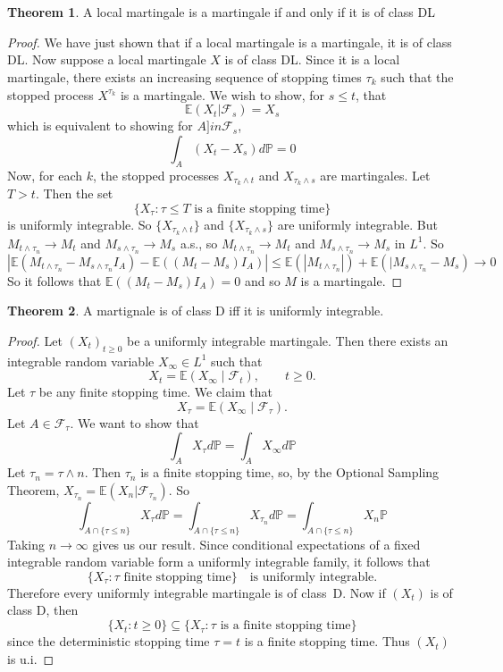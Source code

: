 \documentclass[11pt,a4paper]{article}
\theoremstyle{definition}
\newtheorem{theorem}{Theorem}[section]
\begin{document}
~\\~\\
\begin{theorem}
A local martingale is a martingale if and only if it is of class DL
\end{theorem}

\begin{proof}
We have just shown that if a local martingale is a martingale, it is of class DL. Now suppose a local martingale $X$ is of class DL. Since it is a local martingale, there exists an increasing sequence of stopping times $\tau_k$ such that the stopped process $X^{\tau_k}$ is a martingale. We wish to show, for $s \le t$, that \[
\mathbb{E}(X_t | \mathcal{F}_s) = X_s
\]
which is equivalent to showing for $A ]in \mathcal{F}_s$, \[
\int _A (X_t - X_s) d\mathbb{P} = 0
\]
Now, for each $k$, the stopped processes $X_{\tau_k \land t}$ and $X_{\tau_k \land s}$ are martingales. Let $T > t$. Then the set \[
\{X_\tau : \tau \le T \text{ is a finite stopping time}\}
\]
is uniformly integrable. So $\{X_{\tau_k \land t}\}$ and $\{X_{\tau_k \land s}\}$ are uniformly integrable. But $M_{t \land \tau_n} \to M_t$ and $M_{s \land \tau_n} \to M_s$ a.s., so $M_{t \land \tau_n} \to M_t$ and $M_{s \land \tau_n} \to M_s$ in $L^1$. So \[
\left |\mathbb{E}(M_{t \land \tau_n} - M_{s \land \tau_n} I_A) - \mathbb{E}((M_t - M_s)I_A) \right| \le \mathbb{E}(|M_{t \land \tau_n}|) + \mathbb{E}(|M_{s \land \tau_n} - M_s) \to 0
\]
So it follows that $\mathbb{E}((M_t - M_s)I_A) = 0$ and so $M$ is a martingale.
\end{proof}

\begin{theorem}
A martignale is of class D iff it is uniformly integrable.
\end{theorem}

\begin{proof}
Let $(X_t)_{t\ge0}$ be a uniformly integrable martingale.  Then there exists
an integrable random variable $X_\infty\in L^1$ such that
\[
X_t = \mathbb{E}(X_\infty \mid \mathcal{F}_t), \qquad t\ge0.
\]
Let $\tau$ be any finite stopping time.  We claim that 
\[
X_\tau = \mathbb{E}(X_\infty \mid \mathcal{F}_\tau).
\]
Let $A \in \mathcal{F}_\tau$. We want to show that \[
\int_A X_\tau d\mathbb{P} = \int_A X_\infty d\mathbb{P}
\]
Let $\tau_n = \tau \land n$. Then $\tau_n$ is a finite stopping time, so, by the Optional Sampling Theorem, $X_{\tau_n} = \mathbb{E}(X_n | \mathcal{F}_{\tau_n})$. So \[
\int_{A \cap \{\tau \le n\}}X_\tau d\mathbb{P} = \int_{A \cap \{\tau \le n\}}X_{\tau_n} d\mathbb{P} = \int_{A \cap \{\tau \le n\}}X_n\mathbb{P}
\]
Taking $n \to \infty$ gives us our result. Since conditional expectations of a fixed integrable random variable form a
uniformly integrable family, it follows that
\[
\{ X_\tau : \tau \text{ finite stopping time} \}
\quad\text{is uniformly integrable}.
\]
Therefore every uniformly integrable martingale is of class~D. Now if $(X_t)$ is of class D, then \[
\{X_t: t \ge 0\} \subseteq \{X_\tau : \tau \text{ is a finite stopping time}\}
\]
since the deterministic stopping time $\tau = t$ is a finite stopping time. Thus $(X_t)$ is u.i.
\end{proof}
\end{document}
